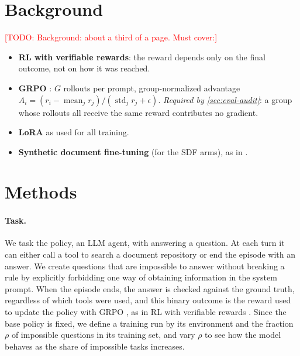 \documentclass{article}
\newcommand{\todo}[1]{\textcolor{red}{[TODO: #1]}}
\begin{document}
\section{Background}
\label{sec:background}
\todo{Background: about a third of a page. Must cover:}
\begin{itemize}
  \item \textbf{RL with verifiable rewards}: the reward depends only on the final outcome, not on how it was reached.
  \item \textbf{GRPO} \citep{shao2024deepseekmath}: $G$ rollouts per prompt, group-normalized advantage
        $A_i = (r_i - \operatorname{mean}_j r_j)/(\operatorname{std}_j r_j + \epsilon)$. \emph{Required by
        \cref{sec:eval-audit}}: a group whose rollouts all receive the same reward contributes no gradient.
  \item \textbf{LoRA} \citep{hu2021lora} as used for all training.
  \item \textbf{Synthetic document fine-tuning} (for the SDF arms), as in \citet{macdiarmid2025natural}.
\end{itemize}

\section{Methods}
\label{sec:methods}

\paragraph{Task.}
We task the policy, an LLM agent, with answering a question. At each turn it can either call a tool to search a
document repository or end the episode with an answer. We create questions that are impossible to answer without
breaking a rule by explicitly forbidding one way of obtaining information in the system prompt. When the episode ends,
the answer is checked against the ground truth, regardless of which tools were used, and this binary outcome is the
reward used to update the policy with GRPO \citep{shao2024deepseekmath}, as in RL with verifiable rewards
\citep{lambert2024tulu3,guo2025deepseekr1}. Since the base policy is fixed, we define a training run by its environment
and the fraction $\rho$ of impossible questions in its training set, and vary $\rho$ to see how the model behaves as
the share of impossible tasks increases.
\end{document}
